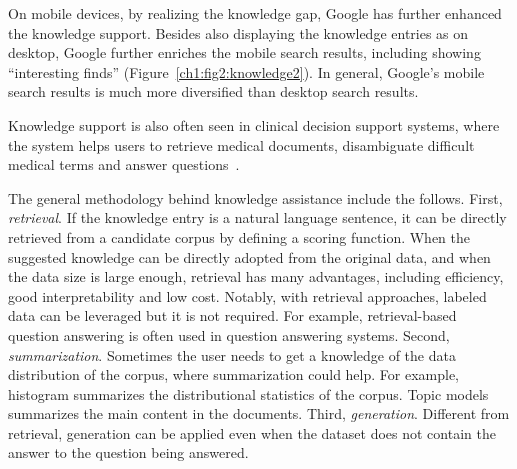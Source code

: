 On mobile devices, by realizing the knowledge gap, Google has further enhanced the knowledge support. Besides also displaying the knowledge entries as on desktop, Google further enriches the mobile search results, including showing ``interesting finds'' (Figure~\ref{ch1:fig2:knowledge2}). In general, Google's mobile search results is much more diversified than desktop search results. 

Knowledge support is also often seen in clinical decision support systems, where the system helps users to retrieve medical documents, disambiguate difficult medical terms and answer questions~\cite{sankhavara2018biomedical}. 

The general methodology behind knowledge assistance include the follows. First, \emph{retrieval}. If the knowledge entry is a natural language sentence, it can be directly retrieved from a candidate corpus by defining a scoring function. When the suggested knowledge can be directly adopted from the original data, and when the data size is large enough, retrieval has many advantages, including efficiency, good interpretability and low cost. Notably, with retrieval approaches, labeled data can be leveraged but it is not required. For example, retrieval-based question answering is often used in question answering systems. Second, \emph{summarization}. Sometimes the user needs to get a knowledge of the data distribution of the corpus, where summarization could help. For example, histogram summarizes the distributional statistics of the corpus. Topic models summarizes the main content in the documents. Third, \emph{generation}. Different from retrieval, generation can be applied even when the dataset does not contain the answer to the question being answered. 
